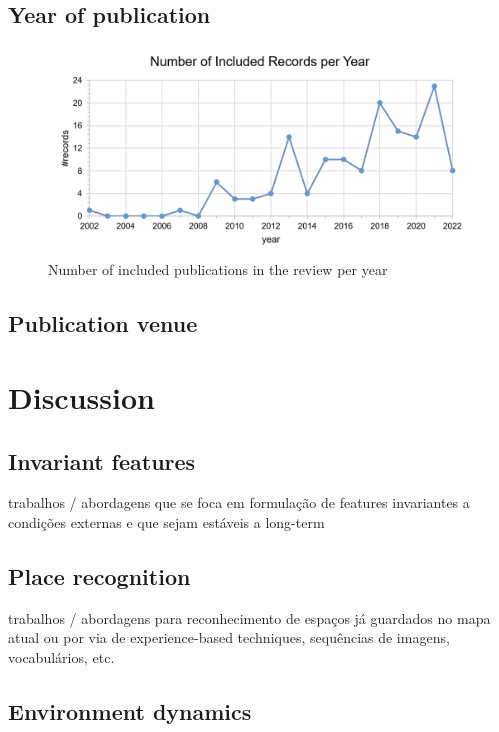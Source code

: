 \documentclass[10pt,a4paper,notitlepage,twocolumn,oneside]{article}
\begin{document}
\subsection{Year of publication}

\begin{figure}[!t]
  \centering
  \includegraphics[width=\columnwidth]{figures/year.png}
  \caption{Number of included publications in the review per year}
  \label{fig:results:year}
\end{figure}

\subsection{Publication venue}

\section{Discussion}
\label{sec:discussion}

\subsection{Invariant features}

trabalhos / abordagens que se foca em formulação de features invariantes a condições externas e que sejam estáveis a long-term

\subsection{Place recognition}

trabalhos / abordagens para reconhecimento de espaços já guardados no mapa atual ou por via de experience-based techniques, sequências de imagens, vocabulários, etc.

\subsection{Environment dynamics}
\end{document}
